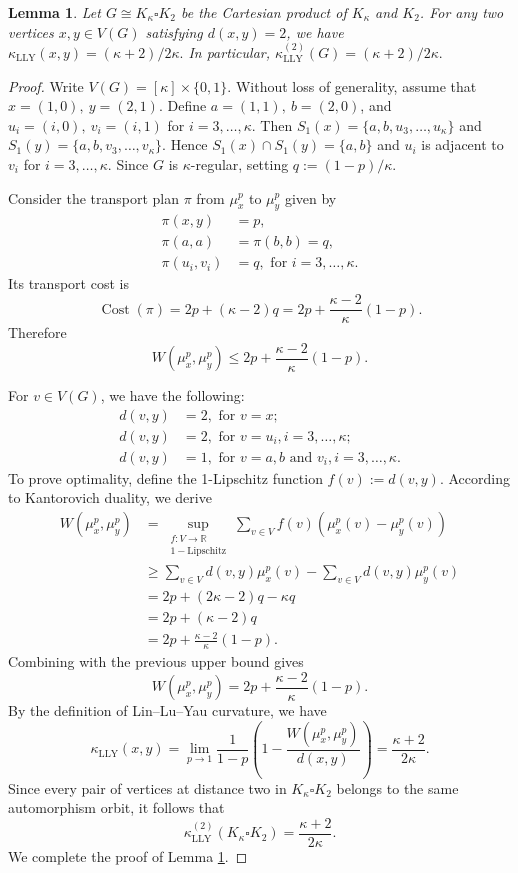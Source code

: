 \documentclass[11pt,bezier]{article}
\newtheorem{lemma}{Lemma}[section]
\theoremstyle{definition}
\theoremstyle{definition}
\theoremstyle{nonumber}
\begin{document}
\begin{lemma} \label{distance2}
Let $G\cong K_{\kappa}\square K_2$ be the Cartesian product of $K_{\kappa}$ and $K_2$.
For any two vertices $x,y\in V(G)$ satisfying $d(x,y)=2$, we have
$\kappa_{\mathrm{LLY}}(x,y)=(\kappa+2)/2\kappa.$
In particular, $\kappa_{\mathrm{LLY}}^{(2)}(G)=(\kappa+2)/2\kappa.$
\end{lemma}

\begin{proof}
Write $V(G)=[\kappa]\times\{0,1\}$. Without loss of generality, assume that $x=(1,0),\ y=(2,1)$. Define $a=(1,1),\ b=(2,0)$, and $u_i=(i,0),\ v_i=(i,1)$ for $i=3,\ldots,\kappa$. 
Then $S_1(x)=\{a,b,u_3,\ldots,u_\kappa\}$ and $S_1(y)=\{a,b,v_3,\ldots,v_\kappa\}$.
Hence $S_1(x)\cap S_1(y)=\{a,b\}$ and $u_i$ is adjacent to $v_i$ for $i=3,\ldots,\kappa$.
Since $G$ is $\kappa$-regular, setting $q:=(1-p)/\kappa$.

Consider the transport plan $\pi$ from $\mu_x^p$ to $\mu_y^p$ given by
\begin{align*} 
\pi(x,y)&=p,\\
\pi(a,a)&=\pi(b,b)=q,\\
\pi(u_i,v_i)&=q, \text{ for } i=3,\ldots,\kappa.
\end{align*}
Its transport cost is
$$
\operatorname{Cost}(\pi)=2p+(\kappa-2)q=2p+\frac{\kappa-2}{\kappa}(1-p).
$$
Therefore
$$
W(\mu_x^p,\mu_y^p)\leq2p+\frac{\kappa-2}{\kappa}(1-p).
$$

For $v\in V(G)$, we have the following:
\begin{align*} 
d(v, y) &= 2, \text{ for } v=x;\\
d(v, y) &= 2, \text{ for } v=u_i, i=3,\ldots,\kappa;\\
d(v, y) &= 1, \text{ for } v=a,b \text{ and }v_i,i=3,\ldots,\kappa.
\end{align*}
To prove optimality, define the 1-Lipschitz function $f(v):=d(v, y)$. According to Kantorovich duality, we derive
\begin{align*}
W(\mu_x^p, \mu_y^p) &= \sup_{\substack{f: V \to \mathbb{R} \\ 1-\text{Lipschitz}}} \sum_{v \in V} f(v) \left( \mu_x^p(v) - \mu_y^p(v) \right)\\
&\geq \sum_{v \in V} d(v, y) \mu_x^p(v) - \sum_{v \in V} d(v, y) \mu_y^p(v)\\
&= 2p+(2\kappa-2)q - \kappa q\\
&=2p+(\kappa-2)q\\
&=2p+\frac{\kappa-2}{\kappa}(1-p).
\end{align*}
Combining with the previous upper bound gives
$$
W(\mu_x^p,\mu_y^p)=2p+\frac{\kappa-2}{\kappa}(1-p).
$$
By the definition of Lin--Lu--Yau curvature, we have
$$
\kappa_{\mathrm{LLY}}(x,y)=\lim_{p\to1}\frac{1}{1-p} \left( 1 - \frac{W(\mu_x^p, \mu_y^p)}{d(x, y)} \right)=\frac{\kappa+2}{2\kappa}.
$$
Since every pair of vertices at distance two in $K_\kappa\square K_2$
belongs to the same automorphism orbit, it follows that
$$
\kappa_{\mathrm{LLY}}^{(2)}(K_\kappa\square K_2)=\frac{\kappa+2}{2\kappa}.
$$
We complete the proof of Lemma \ref{distance2}.
\end{proof}
\end{document}
